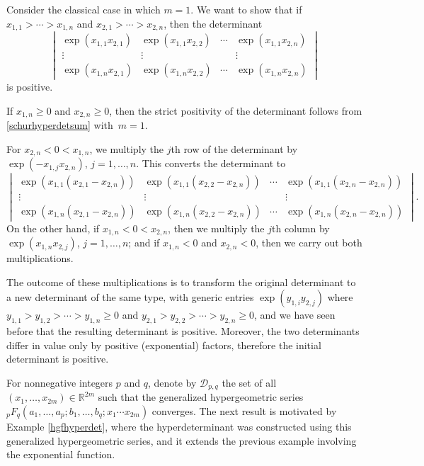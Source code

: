\documentclass[10pt,a4paper]{amsart}
\numberwithin{equation}{section}
\def\R{{\mathbb R}}
\def\mcalD{\mathcal{D}}
\begin{document}
\begin{Example}
Consider the classical case in which $m = 1$. We want to show that if $x_{1,1} > \cdots > x_{1,n}$ and $x_{2,1} > \cdots > x_{2,n}$, then the determinant
\[
\begin{vmatrix}
\exp(x_{1,1}x_{2,1}) & \exp(x_{1,1}x_{2,2}) & \cdots & \exp(x_{1,1}x_{2,n}) \\
\vdots & \vdots & & \vdots \\
\exp(x_{1,n}x_{2,1}) & \exp(x_{1,n}x_{2,2}) & \cdots & \exp(x_{1,n}x_{2,n})
\end{vmatrix}
\]
is positive.

If $x_{1,n} \ge 0$ and $x_{2,n} \ge 0$, then the strict positivity of the determinant follows from \eqref{schurhyperdetsum} with~${m=1}$.

For $x_{2,n} < 0 < x_{1,n}$, we multiply the $j$th row of the determinant by $\exp(-x_{1,j}x_{2,n})$, $j=1,\dots,n$. This converts the determinant to
\[
\begin{vmatrix}
\exp(x_{1,1}(x_{2,1}-x_{2,n})) & \exp(x_{1,1}(x_{2,2}-x_{2,n})) & \cdots & \exp(x_{1,1}(x_{2,n}-x_{2,n})) \\
\vdots & \vdots & & \vdots \\
\exp(x_{1,n}(x_{2,1}-x_{2,n})) & \exp(x_{1,n}(x_{2,2}-x_{2,n})) & \cdots & \exp(x_{1,n}(x_{2,n}-x_{2,n}))
\end{vmatrix}.
\]
On the other hand, if $x_{1,n} < 0 < x_{2,n}$, then we multiply the $j$th column by $\exp(x_{1,n}x_{2,j})$, $j=1,\dots,n$; and if $x_{1,n} < 0$ and $x_{2,n} < 0$, then we carry out both multiplications.

The outcome of these multiplications is to transform the original determinant to a new determinant of the same type, with generic entries $\exp(y_{1,i}y_{2,j})$ where $y_{1,1} > y_{1,2} > \cdots > y_{1,n} \ge 0$ and $y_{2,1} > y_{2,2} > \cdots > y_{2,n} \ge 0$, and we have seen before that the resulting determinant is positive. Moreover, the two determinants differ in value only by positive (exponential) factors, therefore the initial determinant is positive.
\end{Example}


For nonnegative integers $p$ and $q$, denote by $\mcalD_{p,q}$ the set of all $(x_1,\dots,x_{2m}) \in \R^{2m}$ such that the generalized hypergeometric series ${}_pF_q(a_1,\dots,a_p;b_1,\dots,b_q;x_1\cdots x_{2m})$ converges. The next result is motivated by Example \ref{hgfhyperdet}, where the hyperdeterminant was constructed using this generalized hypergeometric series, and it extends the previous example involving the exponential function.
\end{document}
